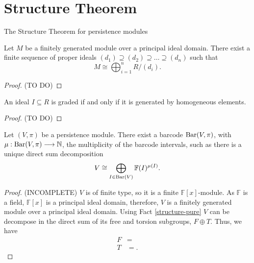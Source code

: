 \begin{definition}
     
\end{definition}

\begin{definition} \label{delta-matching}
    
\end{definition}

\begin{definition}
    
\end{definition}

\newpage
\section{Structure Theorem}
The Structure Theorem for persistence modules 

\begin{theorem} \label{structure-pure}
    Let $ M $ be a  finitely generated module over a principal ideal domain. There exist a finite sequence of proper ideals $ (d_1) \supseteq (d_2) \supseteq \dots \supseteq (d_n) $ such that
    $$
        M \cong \bigoplus_{i=1}^n R / (d_i).
    $$
\end{theorem}
\begin{proof}
    (TO DO)
\end{proof}

\begin{proposition}
    An ideal $ I \subseteq R $ is graded if and only if it is generated by homogeneous elements.
\end{proposition}
\begin{proof}
    (TO DO)
\end{proof}

\begin{theorem}[Structure] \label{structure}
    Let $ (V, \pi) $ be a persistence module. There exist a barcode $ \operatorname{Bar}(V, \pi) $, with $ \mu : \operatorname{Bar} (V, \pi) \longrightarrow \mathbb N $, the multiplicity of the barcode intervals, such as there is a unique direct sum decomposition
    $$
        V \cong \bigoplus_{I \in  \operatorname{Bar} (V)} \mathbb F (I)^{\mu (I)}.
    $$
\end{theorem}
\begin{proof}
    (INCOMPLETE)
    $ V $ is of finite type, so it is a finite $ \mathbb F[x] $-module. As $ \mathbb F $ is a field, $ \mathbb F[x] $ is a principal ideal domain, therefore, $ V $ is a finitely generated module over a principal ideal domain. Using Fact \ref{structure-pure} $ V $ can be decompose in the direct sum of its free and torsion subgroups, $ F \oplus T $. Thus, we have
    \begin{align*}
        F &= \\
        T &= .
    \end{align*}
    
\end{proof}

